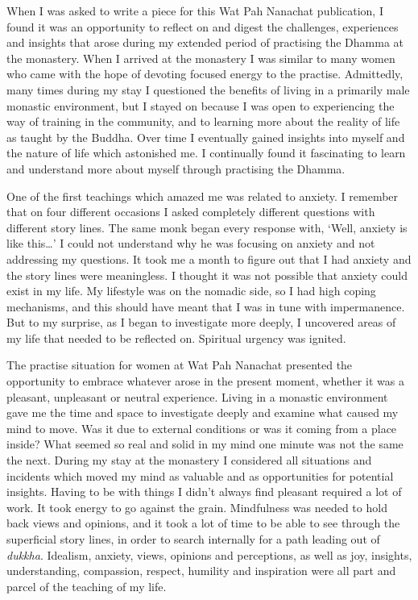 
When I was asked to write a piece for this Wat Pah Nanachat publication, 
I found it was an opportunity to reflect on and digest the challenges, 
experiences and insights that arose during my extended period of
practising the Dhamma at the monastery. When I arrived at the monastery
I was similar to many women who came with the hope of devoting focused
energy to the practise. Admittedly, many times during my stay I
questioned the benefits of living in a primarily male monastic
environment, but I stayed on because I was open to experiencing the way
of training in the community, and to learning more about the reality of
life as taught by the Buddha. Over time I eventually gained insights
into myself and the nature of life which astonished me. I continually
found it fascinating to learn and understand more about myself through
practising the Dhamma. 

One of the first teachings which amazed me was related to anxiety. I
remember that on four different occasions I asked completely different
questions with different story lines. The same monk began every response
with, `Well, anxiety is like this\ldots{}' I could not understand why he
was focusing on anxiety and not addressing my questions. It took me a
month to figure out that I had anxiety and the story lines were
meaningless. I thought it was not possible that anxiety could exist in
my life. My lifestyle was on the nomadic side, so I had high coping
mechanisms, and this should have meant that I was in tune with
impermanence. But to my surprise, as I began to investigate more deeply, 
I uncovered areas of my life that needed to be reflected on. Spiritual
urgency was ignited. 

The practise situation for women at Wat Pah Nanachat presented the
opportunity to embrace whatever arose in the present moment, whether it
was a pleasant, unpleasant or neutral experience. Living in a monastic
environment gave me the time and space to investigate deeply and examine
what caused my mind to move. Was it due to external conditions or was it
coming from a place inside? What seemed so real and solid in my mind one
minute was not the same the next. During my stay at the monastery I
considered all situations and incidents which moved my mind as valuable
and as opportunities for potential insights. Having to be with things I
didn't always find pleasant required a lot of work. It took energy to go
against the grain. Mindfulness was needed to hold back views and
opinions, and it took a lot of time to be able to see through the
superficial story lines, in order to search internally for a path
leading out of \emph{dukkha}. Idealism, anxiety, views, opinions and
perceptions, as well as joy, insights, understanding, compassion, 
respect, humility and inspiration were all part and parcel of the
teaching of my life. 

